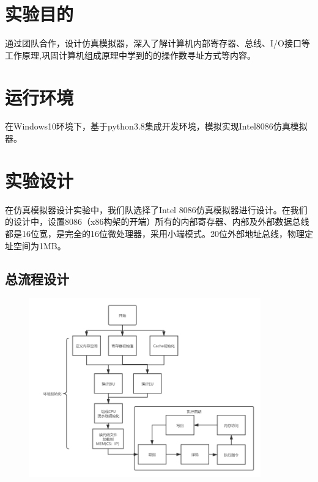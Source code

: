\documentclass[UTF8,12pt]{article}
\begin{document}
	
	
	\tableofcontents
	\newpage
	\section{实验目的}	
	通过团队合作，设计仿真模拟器，深入了解计算机内部寄存器、总线、I/O接口等工作原理,巩固计算机组成原理中学到的的操作数寻址方式等内容。
	
	\section{运行环境}
	在Windows10环境下，基于python3.8集成开发环境，模拟实现Intel8086仿真模拟器。
	
	\section{实验设计}
	在仿真模拟器设计实验中，我们队选择了Intel
	8086仿真模拟器进行设计。在我们的设计中，设置8086（x86构架的开端）所有的内部寄存器、内部及外部数据总线都是16位宽，是完全的16位微处理器，采用小端模式。20位外部地址总线，物理定址空间为1MB。
	\subsection{总流程设计}
	
	\begin{figure}[!htb]
		\centering
		\includegraphics[width=10cm]{fig/flow-chart}
	\end{figure}
	
\end{document}
